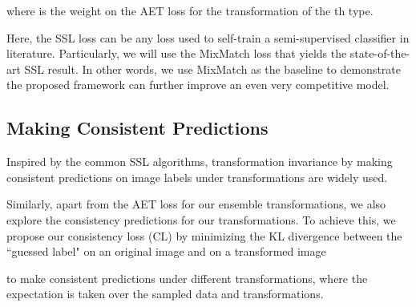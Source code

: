 \documentclass[journal]{IEEEtran}
\begin{document}
where  is the weight on the AET loss  for the transformation  of the th type.

Here, the SSL loss  can be any loss used to self-train a semi-supervised classifier in literature. Particularly, we will use the MixMatch loss \cite{berthelot2019mixmatch} that yields the state-of-the-art SSL result. In other words, we use MixMatch as the baseline to demonstrate the proposed framework can further improve an even very competitive model.



\subsection{Making Consistent Predictions}
\label{sec:consistencyaet}



\par Inspired by the common SSL algorithms, transformation invariance by making consistent predictions on image labels under transformations \cite{rifai2011contractive,miyato2018virtual} are widely used.
\par Similarly, apart from the AET loss for our ensemble transformations, we also explore the consistency predictions for our transformations. To achieve this, we propose our consistency loss (CL) by minimizing the KL divergence  between the ``guessed label"  on an original image  and  on a transformed image 

to make consistent predictions under different transformations, where the expectation is taken over the sampled data and transformations.
\end{document}
